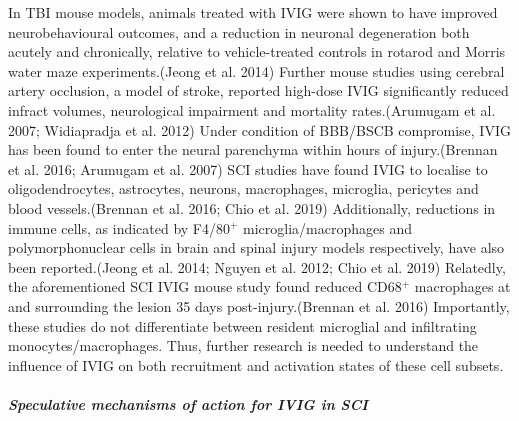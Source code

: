 \documentclass[9pt,lineno]{elife}
\begin{document}
\begin{landscape}
\begin{landscape}
In TBI mouse models, animals treated with IVIG were shown to have improved neurobehavioural outcomes, and a reduction in neuronal degeneration both acutely and chronically, relative to vehicle-treated controls in rotarod and Morris water maze experiments.(Jeong et al. 2014) Further mouse studies using cerebral artery occlusion, a model of stroke, reported high-dose IVIG significantly reduced infract volumes, neurological impairment and mortality rates.(Arumugam et al. 2007; Widiapradja et al. 2012) Under condition of BBB/BSCB compromise, IVIG has been found to enter the neural parenchyma within hours of injury.(Brennan et al. 2016; Arumugam et al. 2007) SCI studies have found IVIG to localise to oligodendrocytes, astrocytes, neurons, macrophages, microglia, pericytes and blood vessels.(Brennan et al. 2016; Chio et al. 2019) Additionally, reductions in immune cells, as indicated by F4/80\(^+\) microglia/macrophages and polymorphonuclear cells in brain and spinal injury models respectively, have also been reported.(Jeong et al. 2014; Nguyen et al. 2012; Chio et al. 2019) Relatedly, the aforementioned SCI IVIG mouse study found reduced CD68\(^+\) macrophages at and surrounding the lesion 35 days post-injury.(Brennan et al. 2016) Importantly, these studies do not differentiate between resident microglial and infiltrating monocytes/macrophages.
Thus, further research is needed to understand the influence of IVIG on both recruitment and activation states of these cell subsets.

\hypertarget{speculative-mechanisms-of-action-for-ivig-in-sci}{%
\subparagraph{Speculative mechanisms of action for IVIG in SCI}\label{speculative-mechanisms-of-action-for-ivig-in-sci}}


\end{landscape}
\end{landscape}
\end{document}
